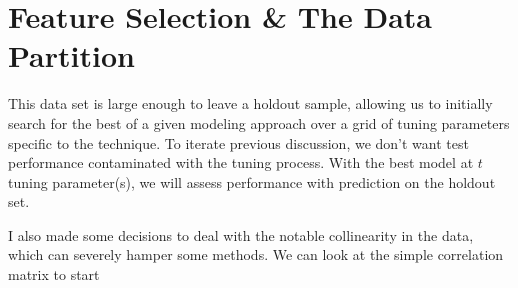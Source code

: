 \documentclass[english,nohyper,titlepage]{tufte-handout}\usepackage{knitr}
\begin{document}
\section{Feature Selection \& The Data Partition}
This data set is large enough to leave a holdout sample, allowing us to initially search for the best of a given modeling approach over a grid of tuning parameters specific to the technique.  To iterate previous discussion, we don't want test performance contaminated with the tuning process.  With the best model at $t$ tuning parameter(s), we will assess performance with prediction on the holdout set.

I also made some decisions to deal with the notable collinearity in the data, which can severely hamper some methods.  We can look at the simple correlation matrix to start

\begin{knitrout}\footnotesize
{}\color{fgcolor}\begin{kframe}
\begin{alltt}
\hlstd{(}\hlstd{(wine[,} \hlopt{-}\hlstd{(}\hlstd{,} \hlstd{)]),}  \hlstd{=} \hlstd{,}  \hlstd{=} \hlstd{)}
\end{alltt}
\end{kframe}
\end{knitrout}
\end{document}
